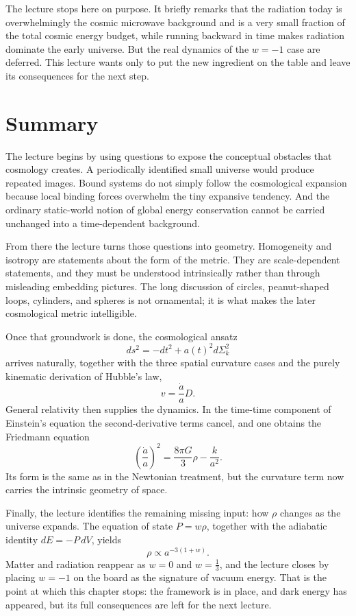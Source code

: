 The lecture stops here on purpose. It briefly remarks that the radiation today is overwhelmingly the cosmic microwave background and is a very small fraction of the total cosmic energy budget, while running backward in time makes radiation dominate the early universe. But the real dynamics of the \(w=-1\) case are deferred. This lecture wants only to put the new ingredient on the table and leave its consequences for the next step.

\section{Summary}

The lecture begins by using questions to expose the conceptual obstacles that cosmology creates. A periodically identified small universe would produce repeated images. Bound systems do not simply follow the cosmological expansion because local binding forces overwhelm the tiny expansive tendency. And the ordinary static-world notion of global energy conservation cannot be carried unchanged into a time-dependent background.

From there the lecture turns those questions into geometry. Homogeneity and isotropy are statements about the form of the metric. They are scale-dependent statements, and they must be understood intrinsically rather than through misleading embedding pictures. The long discussion of circles, peanut-shaped loops, cylinders, and spheres is not ornamental; it is what makes the later cosmological metric intelligible.

Once that groundwork is done, the cosmological ansatz
\begin{equation}
ds^{2}=-dt^{2}+a(t)^{2}d\Sigma_{k}^{2}
\end{equation}
arrives naturally, together with the three spatial curvature cases and the purely kinematic derivation of Hubble's law,
\begin{equation}
v=\frac{\dot a}{a}D .
\end{equation}
General relativity then supplies the dynamics. In the time-time component of Einstein's equation the second-derivative terms cancel, and one obtains the Friedmann equation
\begin{equation}
\left(\frac{\dot a}{a}\right)^{2}=\frac{8\pi G}{3}\rho-\frac{k}{a^{2}} .
\end{equation}
Its form is the same as in the Newtonian treatment, but the curvature term now carries the intrinsic geometry of space.

Finally, the lecture identifies the remaining missing input: how \(\rho\) changes as the universe expands. The equation of state \(P=w\rho\), together with the adiabatic identity \(dE=-P\,dV\), yields
\begin{equation}
\rho\propto a^{-3(1+w)} .
\end{equation}
Matter and radiation reappear as \(w=0\) and \(w=\tfrac13\), and the lecture closes by placing \(w=-1\) on the board as the signature of vacuum energy. That is the point at which this chapter stops: the framework is in place, and dark energy has appeared, but its full consequences are left for the next lecture.